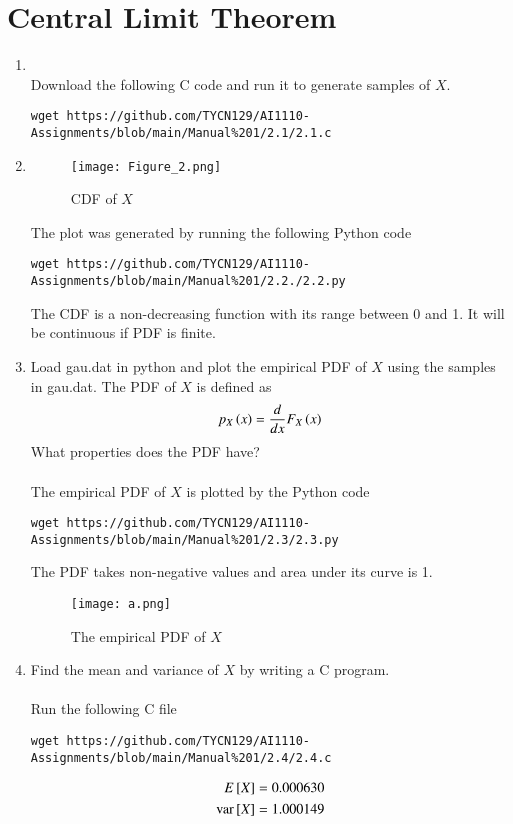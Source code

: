 \documentclass[journal,12pt,twocolumn]{IEEEtran}
\renewcommand\thesection{\arabic{section}}
\begin{document}
\section{Central Limit Theorem}
\begin{enumerate}[label=\thesection.\arabic*
,ref=\thesection.\theenumi]
\item \solution\\
Download the following C code and run it to generate samples of $X$.
\begin{lstlisting}
wget https://github.com/TYCN129/AI1110-Assignments/blob/main/Manual%201/2.1/2.1.c
\end{lstlisting}
\item \solution
\begin{figure}[H]
    \centering
    \texttt{[image: Figure\_2.png]}
    \caption{CDF of $X$}
    \label{fig:my_label}
\end{figure}
The plot was generated by running the following Python code
\begin{lstlisting}
wget https://github.com/TYCN129/AI1110-Assignments/blob/main/Manual%201/2.2./2.2.py
\end{lstlisting}
The CDF is a non-decreasing function with its range between 0 and 1. It will be continuous if PDF is finite.\\
\item {Load gau.dat in python and plot the empirical PDF of $X$ using the samples in gau.dat. The PDF of $X$ is defined as
\begin{align}
p_{X}\left(x\right) = \frac{d}{dx}F_{X}\left(x\right)
\label{eq:pdf_cdf}
\end{align}
What properties does the PDF have?}\\
\solution \\
The empirical PDF of $X$ is plotted by the Python code
\begin{lstlisting}
wget https://github.com/TYCN129/AI1110-Assignments/blob/main/Manual%201/2.3/2.3.py
\end{lstlisting}
The PDF takes non-negative values and area under its curve is 1.
\clearpage
\begin{figure}[h!]
    \centering
    \texttt{[image: a.png]}
    \caption{The empirical PDF of $X$}
    \label{fig:my_label}
\end{figure}

\item Find the mean and variance of $X$ by writing a C program.
\\
\solution\\
Run the following C file
\begin{lstlisting}
wget https://github.com/TYCN129/AI1110-Assignments/blob/main/Manual%201/2.4/2.4.c
\end{lstlisting}
\begin{align}
E{}\left[X\right]  &= 0.000630 \\
\text{var}{}\left[X\right]  &= 1.000149
\end{align}


\end{enumerate}
\end{document}
